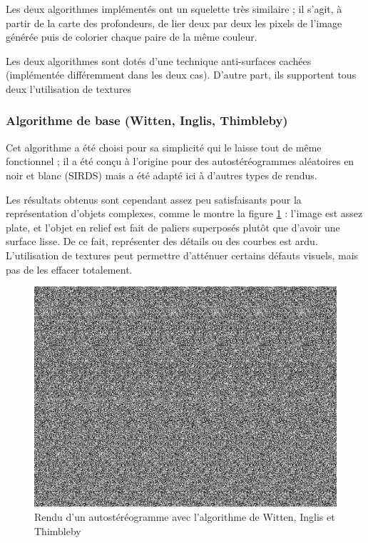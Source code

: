   Les deux algorithmes implémentés ont un squelette très similaire ; il s'agit, à partir de la carte des profondeurs, de lier deux par deux les pixels de l'image générée puis de colorier chaque paire de la même couleur.

  Les deux algorithmes sont dotés d'une technique anti-surfaces cachées (implémentée différemment dans les deux cas). D'autre part, ils supportent tous deux l'utilisation de textures 
  
  \subsubsection{Algorithme de base (Witten, Inglis, Thimbleby)}

  Cet algorithme a été choisi pour sa simplicité qui le laisse tout de même fonctionnel ; il a été conçu à l'origine pour des autostéréogrammes aléatoires en noir et blanc (SIRDS) mais a été adapté ici à d'autres types de rendus.

  Les résultats obtenus sont cependant assez peu satisfaisants pour la représentation d'objets complexes, comme le montre la figure \ref{fig:autoste1} : l'image est assez plate, et l'objet en relief est fait de paliers superposés plutôt que d'avoir une surface lisse. De ce fait, représenter des détails ou des courbes est ardu. L'utilisation de textures peut permettre d'atténuer certains défauts visuels, mais pas de les effacer totalement.

\begin{figure}[h]
	\centering
	\includegraphics[scale=0.3]{autoste1.png}
	\caption{\label{fig:autoste1} Rendu d'un autostéréogramme avec l'algorithme de Witten, Inglis et Thimbleby \protect}
\end{figure}

